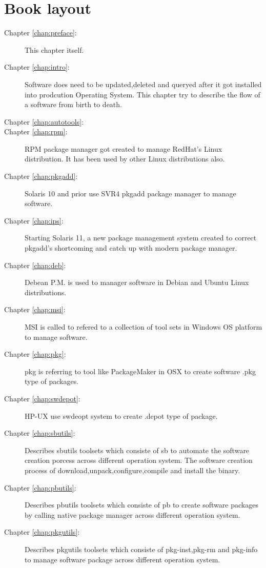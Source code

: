 \section*{Book layout}
\begin{description}
\item[Chapter \ref{chap:preface}: ]
This chapter itself.
\item[Chapter \ref{chap:intro}: ]
Software does need to be updated,deleted and queryed after it got installed into prodcution Operating System. 
This chapter try to describe the flow of a software from birth to death.
\item[Chapter \ref{chap:autotools}: ]
\item[Chapter \ref{chap:rpm}: ]
RPM package manager got created to manage RedHat's Linux distribution. It has been used by other Linux distributions also.
\item[Chapter \ref{chap:pkgadd}: ]
Solaris 10 and prior use SVR4 pkgadd package manager to manage software.
\item[Chapter \ref{chap:ips}: ]
Starting Solaris 11, a new package management system created to correct pkgadd's shortcoming and catch up with modern package manager.
\item[Chapter \ref{chap:deb}: ]
Debean P.M. is used to manager software in Debian and Ubuntu Linux distributions.
\item[Chapter \ref{chap:msi}: ]
MSI is called to refered to a collection of tool sets in Windows OS platform to manage software.
\item[Chapter \ref{chap:pkg}: ]
pkg is referring to tool like PackageMaker in OSX to create software .pkg type of packages.
\item[Chapter \ref{chap:swdepot}: ]
HP-UX use swdeopt system to create .depot type of package.
\item[Chapter \ref{chap:sbutils}: ]
Describes sbutils toolsets which consiste of sb to automate the software creation porcess across different operation system. 
The software creation process of download,unpack,configure,compile and install the binary.

\item[Chapter \ref{chap:pbutils}: ] 
Describes pbutils toolsets which consiste of pb to create software packages by calling native  package manager across different operation system.
\item[Chapter \ref{chap:pkgutils}: ] 
Describes pkgutils toolsets which consiste of pkg-inst,pkg-rm and pkg-info to manage software package across different operation system.

\end{description}

